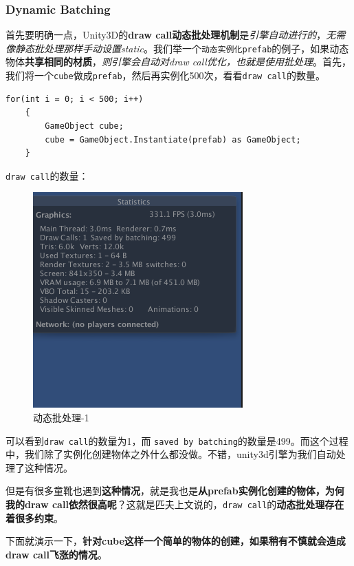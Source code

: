 \documentclass[UTF8,a4paper,12pt]{ctexart}
\begin{document}
			  	\subsubsection*{Dynamic Batching}
	  				首先要明确一点，Unity3D的\textbf{draw call动态批处理机制}是\textit{引擎自动进行的}，\textit{无需像静态批处理那样手动设置static}。我们举一个\verb|动态实例化prefab|的例子，如果动态物体\textbf{共享相同的材质}，\textit{则引擎会自动对draw call优化，也就是使用批处理}。首先，我们将一个\verb|cube|做成\verb|prefab|，然后再实例化500次，看看\verb|draw call|的数量。
	  				
	  				\begin{lstlisting}[frame=L, xleftmargin = .079\textwidth]
	for(int i = 0; i < 500; i++)
	{
		GameObject cube;
		cube = GameObject.Instantiate(prefab) as GameObject;
	}
	  				\end{lstlisting}
	  				
	  				\verb|draw call|的数量：
	  				\begin{figure}[H]
	  					\centering
	  					\includegraphics[scale=0.8]{afterDynamicBatching2.png}
	  					\caption{动态批处理-1}
	  				\end{figure}
	  				
	  				
	  				可以看到\verb|draw call|的数量为1，而 \verb|saved by batching|的数量是499。而这个过程中，我们除了实例化创建物体之外什么都没做。不错，unity3d引擎为我们自动处理了这种情况。
	  				
	  				但是有很多童靴也遇到\textbf{这种情况}，就是我也是\textbf{从prefab实例化创建的物体，为何我的draw call依然很高呢}？这就是匹夫上文说的，\verb|draw call|的\textbf{动态批处理存在着很多约束}。
	  				
	  				下面就演示一下，\textbf{针对cube这样一个简单的物体的创建，如果稍有不慎就会造成draw call飞涨的情况}。
	  				
\end{document}
